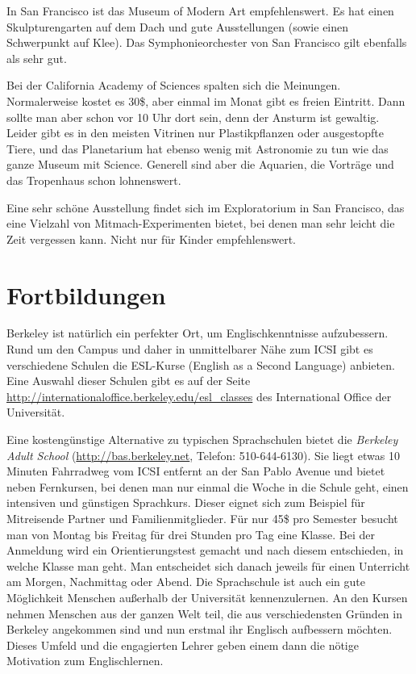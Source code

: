 \documentclass[a4paper]{scrreprt}
\begin{document}
In San Francisco ist das Museum of Modern Art empfehlenswert. Es hat einen Skulpturengarten auf dem Dach und gute Ausstellungen (sowie einen Schwerpunkt auf Klee). Das Symphonieorchester von San Francisco gilt ebenfalls als sehr gut.

Bei der California Academy of Sciences spalten sich die Meinungen. Normalerweise kostet es 30\$, aber einmal im Monat gibt es freien Eintritt. Dann sollte man aber schon vor 10 Uhr dort sein, denn der Ansturm ist gewaltig. Leider gibt es in den meisten Vitrinen nur Plastikpflanzen oder ausgestopfte Tiere, und das Planetarium hat ebenso wenig mit Astronomie zu tun wie das ganze Museum mit Science. Generell sind aber die Aquarien, die Vorträge und das Tropenhaus schon lohnenswert.

Eine sehr schöne Ausstellung findet sich im Exploratorium in San Francisco, das eine Vielzahl von Mitmach-Experimenten bietet, bei denen man sehr leicht die Zeit vergessen kann. Nicht nur für Kinder empfehlenswert.
 
\section{Fortbildungen}

Berkeley ist natürlich ein perfekter Ort, um Englischkenntnisse
aufzubessern. Rund um den Campus und daher in unmittelbarer Nähe zum
ICSI gibt es verschiedene Schulen die ESL-Kurse (English as a Second
Language) anbieten. Eine Auswahl dieser Schulen gibt es auf der Seite
\url{http://internationaloffice.berkeley.edu/esl_classes} des International
Office der Universität.  

Eine kostengünstige Alternative zu typischen Sprachschulen bietet die
\emph{Berkeley Adult School} (\url{http://bas.berkeley.net}, Telefon:
510-644-6130). Sie liegt etwas 10 Minuten Fahrradweg vom ICSI entfernt
an der San Pablo Avenue und bietet neben Fernkursen, bei denen man nur
einmal die Woche in die Schule geht, einen intensiven und günstigen
Sprachkurs. Dieser eignet sich zum Beispiel für Mitreisende Partner
und Familienmitglieder. Für nur 45\$ pro Semester besucht man von
Montag bis Freitag für drei Stunden pro Tag eine Klasse. Bei der
Anmeldung wird ein Orientierungstest gemacht und nach diesem
entschieden, in welche Klasse man geht. Man entscheidet sich danach
jeweils für einen Unterricht am Morgen, Nachmittag oder Abend. Die
Sprachschule ist auch ein gute Möglichkeit Menschen außerhalb der
Universität kennenzulernen. An den Kursen nehmen Menschen aus der
ganzen Welt teil, die aus verschiedensten Gründen in Berkeley
angekommen sind und nun erstmal ihr Englisch aufbessern
möchten. Dieses Umfeld und die engagierten Lehrer geben einem dann die
nötige Motivation zum Englischlernen. 
\end{document}
